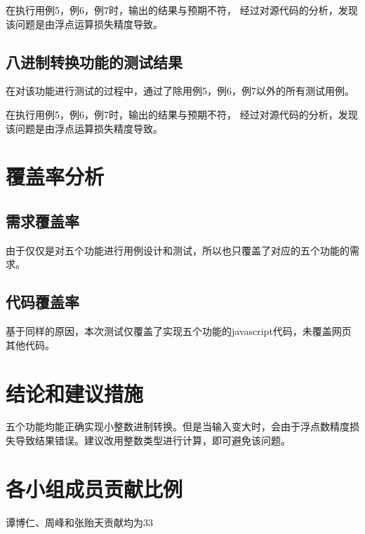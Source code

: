 \documentclass[12pt, a4paper, oneside]{ctexart}
\begin{document}
在执行用例5，例6，例7时，输出的结果与预期不符，
经过对源代码的分析，发现该问题是由浮点运算损失精度导致。

\subsection{八进制转换功能的测试结果}
在对该功能进行测试的过程中，通过了除用例5，例6，例7以外的所有测试用例。

在执行用例5，例6，例7时，输出的结果与预期不符，
经过对源代码的分析，发现该问题是由浮点运算损失精度导致。

\section{覆盖率分析}
\subsection{需求覆盖率}
由于仅仅是对五个功能进行用例设计和测试，所以也只覆盖了对应的五个功能的需求。

\subsection{代码覆盖率}
基于同样的原因，本次测试仅覆盖了实现五个功能的javascript代码，未覆盖网页其他代码。

\section{结论和建议措施}
五个功能均能正确实现小整数进制转换。但是当输入变大时，会由于浮点数精度损失导致结果错误。建议改用整数类型进行计算，即可避免该问题。

\section{各小组成员贡献比例}
谭博仁、周峰和张贻天贡献均为33%
\end{document}

